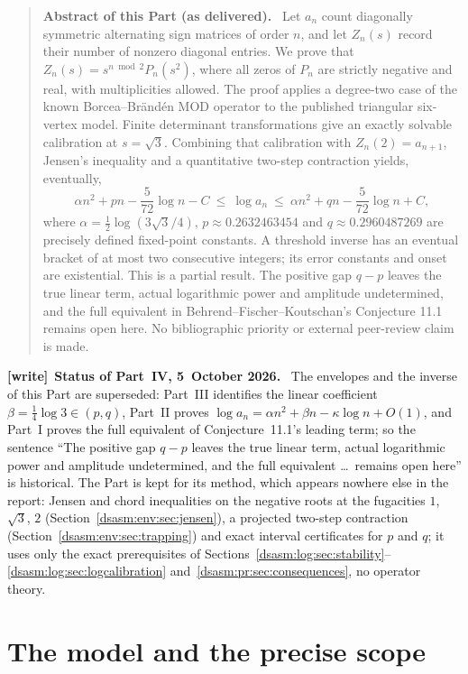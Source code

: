 \documentclass[11pt,letterpaper]{article}
\theoremstyle{remark}\newtheorem{remark}[theorem]{Remark}
\newenvironment{writenote}[1][]{\par\smallskip\begingroup\small
 \noindent\textbf{[write]}\if\relax\detokenize{#1}\relax\else~\textbf{#1.}\fi\ }%
 {\par\endgroup\smallskip}
\newenvironment{partabstract}{\begin{quote}\small\noindent\textbf{Abstract of this Part (as delivered).}\ }{\end{quote}}
\begin{document}
\begin{partabstract}
Let $a_n$ count diagonally symmetric alternating sign matrices of order
$n$, and let $Z_n(s)$ record their number of nonzero diagonal entries.
We prove that $Z_n(s)=s^{n\bmod2}P_n(s^2)$, where all zeros of $P_n$
are strictly negative and real, with multiplicities allowed. The proof
applies a degree-two case of the known Borcea--Br\"and\'en MOD operator
to the published triangular six-vertex model. Finite determinant
transformations give an exactly solvable calibration at $s=\sqrt3$.
Combining that calibration with $Z_n(2)=a_{n+1}$, Jensen's inequality
and a quantitative two-step contraction yields, eventually,
\[
 \alpha n^2+pn-\frac5{72}\log n-C
 \ \le\ \log a_n\ \le\
 \alpha n^2+qn-\frac5{72}\log n+C,
\]
where $\alpha=\frac12\log(3\sqrt3/4)$,
$p\approx0.2632463454$ and $q\approx0.2960487269$ are precisely defined
fixed-point constants. A threshold inverse has an eventual bracket
of at most two consecutive integers; its error constants and onset
are existential. This is a partial result. The positive gap $q-p$
leaves the true linear term, actual logarithmic power and amplitude
undetermined, and the full equivalent in Behrend--Fischer--Koutschan's
Conjecture 11.1 remains open here. No bibliographic priority or
external peer-review claim is made.
\end{partabstract}
\begin{writenote}[Status of Part~IV, 5~October 2026]
The envelopes and the inverse of this Part are superseded: Part~III identifies the linear coefficient $\beta=\frac14\log3\in(p,q)$, Part~II proves $\log a_n=\alpha n^2+\beta n-\kappa\log n+O(1)$, and Part~I proves the full equivalent of Conjecture~11.1's leading term; so the sentence ``The positive gap $q-p$ leaves the true linear term, actual logarithmic power and amplitude undetermined, and the full equivalent \ldots\ remains open here'' is historical. The Part is kept for its method, which appears nowhere else in the report: Jensen and chord inequalities on the negative roots at the fugacities $1$, $\sqrt3$, $2$ (Section~\ref{dsasm:env:sec:jensen}), a projected two-step contraction (Section~\ref{dsasm:env:sec:trapping}) and exact interval certificates for $p$ and $q$; it uses only the exact prerequisites of Sections~\ref{dsasm:log:sec:stability}--\ref{dsasm:log:sec:logcalibration} and~\ref{dsasm:pr:sec:consequences}, no operator theory.
\end{writenote}
\section{The model and the precise scope}\label{dsasm:env:sec:main}
\end{document}
